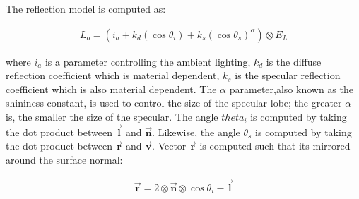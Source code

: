 \noindent The reflection model is computed as:

	\begin{eqnarray*}
		L_o = (i_a + k_d(\cos\theta_i) + k_s(\cos\theta_s)^\alpha) \otimes E_L
	\end{eqnarray*}

\noindent where $i_a$ is a parameter controlling the ambient lighting, $k_d$ is the diffuse reflection coefficient which is material dependent, $k_s$ is the specular reflection coefficient which is also material dependent. The $\alpha$ parameter,also known as the shininess constant, is used to control the size of the specular lobe; the greater $\alpha$ is, the smaller the size of the specular. The angle $theta_i$ is computed by taking the dot product between $\vec{\mathbf{l}}$ and $\vec{\mathbf{n}}$. Likewise, the angle $\theta_s$ is computed by taking the dot product between $\vec{\mathbf{r}}$ and $\vec{\mathbf{v}}$. Vector $\vec{\mathbf{r}}$ is computed such that its mirrored around the surface normal:

	\begin{eqnarray*}
		\vec{\mathbf{r}} = 2 \otimes \vec{\mathbf{n}} \otimes \cos\theta_i - \vec{\mathbf{l}}
	\end{eqnarray*}




